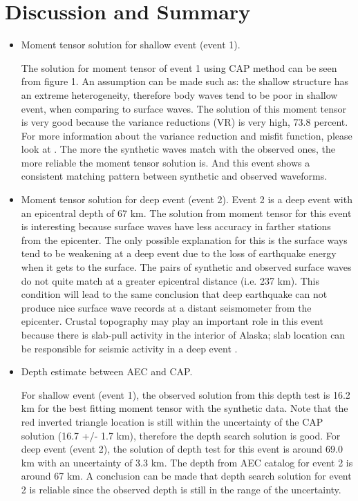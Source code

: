 \documentclass[11pt,titlepage,fleqn]{article}
\begin{document}
\section{Discussion and Summary}

\begin{itemize}

\item Moment tensor solution for shallow event (event 1).

The solution for moment tensor of event 1 using CAP method can be seen from figure 1.
An assumption can be made such as: the shallow structure has an extreme heterogeneity, therefore body waves tend to be poor in shallow event, when comparing to surface waves. The solution of this moment tensor is very good because the variance reductions (VR) is very high, 73.8 percent. For more information about the variance reduction and misfit function, please look at \citet{AlvizuriTape2016}. The more the synthetic waves match with the observed ones, the more reliable the moment tensor solution is. And this event shows a consistent matching pattern between synthetic and observed waveforms.

\item Moment tensor solution for deep event (event 2).
Event 2 is a deep event with an epicentral depth of 67 km. The solution from moment tensor for this event is interesting because surface waves have less accuracy in farther stations from the epicenter.
The only possible explanation for this is the surface ways tend to be weakening at a deep event due to the loss of earthquake energy when it gets to the surface. The pairs of synthetic and observed surface waves do not quite match at a greater epicentral distance (i.e. 237 km). This condition will lead to the same conclusion that deep earthquake can not produce nice surface wave records at a distant seismometer from the epicenter. Crustal topography may play an important role in this event because there is slab-pull activity in the interior of Alaska; slab location can be responsible for seismic activity in a deep event \citet{Tape2015}.

\item Depth estimate between AEC and CAP.

For shallow event (event 1), the observed solution from this depth test is 16.2 km for the best fitting moment tensor with the synthetic data. Note that the red inverted triangle location is still within the uncertainty of the CAP solution (16.7 +/- 1.7 km), therefore the depth search solution is good. 
For deep event (event 2), the solution of depth test for this event is around 69.0 km with an uncertainty of 3.3 km. The depth from AEC catalog for event 2 is around 67 km. A conclusion can be made that depth search solution for event 2 is reliable since the observed depth is still in the range of the uncertainty. 


\end{itemize}
\end{document}
